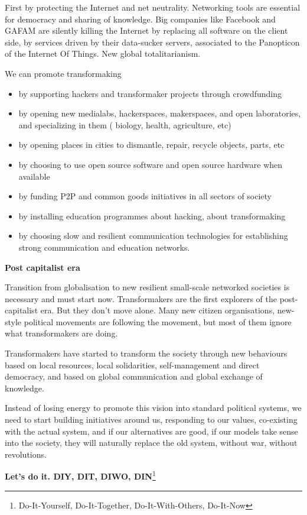 First by protecting the Internet and net neutrality. Networking tools
are essential for democracy and sharing of knowledge. Big companies like
Facebook and GAFAM are silently killing the Internet by replacing all
software on the client side, by services driven by their data-sucker
servers, associated to the Panopticon of the Internet Of Things. New
global totalitarianism.

We can promote transformaking

\begin{itemize}
\tightlist
\item
  by supporting hackers and transformaker projects through crowdfunding
\item
  by opening new medialabs, hackerspaces, makerspaces, and open
  laboratories, and specializing in them ( biology, health, agriculture,
  etc)
\item
  by opening places in cities to dismantle, repair, recycle objects,
  parts, etc
\item
  by choosing to use open source software and open source hardware when
  available
\item
  by funding P2P and common goods initiatives in all sectors of society
\item
  by installing education programmes about hacking, about transformaking
\item
  by choosing slow and resilient communication technologies for
  establishing strong communication and education networks.
\end{itemize}

\textbf{Post capitalist era}

Transition from globalisation to new resilient small-scale networked
societies is necessary and must start now. Transformakers are the first
explorers of the post-capitalist era. But they don't move alone. Many
new citizen organisations, new-style political movements are following
the movement, but most of them ignore what transformakers are doing.

Transformakers have started to transform the society through new
behaviours based on local resources, local solidarities, self-management
and direct democracy, and based on global communication and global
exchange of knowledge.

Instead of losing energy to promote this vision into standard political
systems, we need to start building initiatives around us, responding to
our values, co-existing with the actual system, and if our alternatives
are good, if our models take sense into the society, they will naturally
replace the old system, without war, without revolutions.

\textbf{Let's do it. DIY, DIT, DIWO, DIN}\footnote{Do-It-Yourself,
  Do-It-Together, Do-It-With-Others, Do-It-Now}
